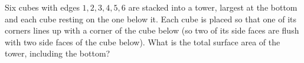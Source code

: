 Six cubes with edges $1,2,3,4,5,6$ are stacked into a tower, largest at the bottom and each cube resting on the one below it. Each cube is placed so that one of its corners lines up with a corner of the cube below (so two of its side faces are flush with two side faces of the cube below). What is the total surface area of the tower, including the bottom?
